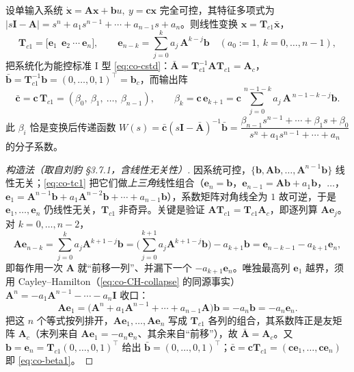 \begin{theorem}\label{thm:co-canon-transform}
设单输入系统 $\dot{\mathbf{x}}=\mathbf{A}\mathbf{x}+\mathbf{b}u,\ y=\mathbf{c}\mathbf{x}$ 完全可控，其特征多项式为 $|s\mathbf{I}-\mathbf{A}|=s^n+a_1 s^{n-1}+\cdots+a_{n-1}s+a_n$。则线性变换 $\mathbf{x}=\mathbf{T}_{c1}\bar{\mathbf{x}}$，
\begin{equation}
  \mathbf{T}_{c1}=\big[\mathbf{e}_1\ \ \mathbf{e}_2\ \cdots\ \mathbf{e}_n\big],\qquad
  \mathbf{e}_{n-k}=\sum_{j=0}^{k}a_j\,\mathbf{A}^{k-j}\mathbf{b}\quad(a_0:=1,\ k=0,\dots,n-1),
  \label{eq:co-tc1}
\end{equation}
把系统化为能控标准 I 型 \cref{eq:co-cstd}：$\bar{\mathbf{A}}=\mathbf{T}_{c1}^{-1}\mathbf{A}\mathbf{T}_{c1}=\mathbf{A}_c$，$\bar{\mathbf{b}}=\mathbf{T}_{c1}^{-1}\mathbf{b}=(0,\dots,0,1)^\top=\mathbf{b}_c$，而输出阵
\begin{equation}
  \bar{\mathbf{c}}=\mathbf{c}\,\mathbf{T}_{c1}=(\beta_0,\ \beta_1,\ \dots,\ \beta_{n-1}),\qquad
  \beta_k=\mathbf{c}\,\mathbf{e}_{k+1}=\mathbf{c}\sum_{j=0}^{\,n-1-k}a_j\,\mathbf{A}^{\,n-1-k-j}\mathbf{b}.
  \label{eq:co-beta1}
\end{equation}
此 $\beta_i$ 恰是变换后传递函数 $W(s)=\bar{\mathbf{c}}(s\mathbf{I}-\bar{\mathbf{A}})^{-1}\bar{\mathbf{b}}=\dfrac{\beta_{n-1}s^{n-1}+\cdots+\beta_1 s+\beta_0}{s^n+a_1 s^{n-1}+\cdots+a_n}$ 的分子系数\cite{liubao2006modern}。
\end{theorem}

\begin{proof}[构造法（取自刘豹 §3.7.1，含线性无关性）]
因系统可控，$\{\mathbf{b},\mathbf{A}\mathbf{b},\dots,\mathbf{A}^{n-1}\mathbf{b}\}$ 线性无关；\cref{eq:co-tc1} 把它们做\emph{上三角}线性组合（$\mathbf{e}_n=\mathbf{b}$，$\mathbf{e}_{n-1}=\mathbf{A}\mathbf{b}+a_1\mathbf{b}$，$\dots$，$\mathbf{e}_1=\mathbf{A}^{n-1}\mathbf{b}+a_1\mathbf{A}^{n-2}\mathbf{b}+\cdots+a_{n-1}\mathbf{b}$），系数矩阵对角线全为 $1$ 故可逆，于是 $\mathbf{e}_1,\dots,\mathbf{e}_n$ 仍线性无关，$\mathbf{T}_{c1}$ 非奇异。关键是验证 $\mathbf{A}\mathbf{T}_{c1}=\mathbf{T}_{c1}\mathbf{A}_c$，即逐列算 $\mathbf{A}\mathbf{e}_j$。对 $k=0,\dots,n-2$，
\[
  \mathbf{A}\mathbf{e}_{n-k}=\sum_{j=0}^{k}a_j\mathbf{A}^{k+1-j}\mathbf{b}
  =\Big(\sum_{j=0}^{k+1}a_j\mathbf{A}^{k+1-j}\mathbf{b}\Big)-a_{k+1}\mathbf{b}
  =\mathbf{e}_{n-k-1}-a_{k+1}\mathbf{e}_n,
\]
即每作用一次 $\mathbf{A}$ 就“前移一列”、并漏下一个 $-a_{k+1}\mathbf{e}_n$。唯独最高列 $\mathbf{e}_1$ 越界，须用 Cayley--Hamilton（\cref{eq:co-CH-collapse} 的同源事实）$\mathbf{A}^{n}=-a_1\mathbf{A}^{n-1}-\cdots-a_n\mathbf{I}$ 收口：
\[
  \mathbf{A}\mathbf{e}_1=\big(\mathbf{A}^{n}+a_1\mathbf{A}^{n-1}+\cdots+a_{n-1}\mathbf{A}\big)\mathbf{b}=-a_n\mathbf{b}=-a_n\mathbf{e}_n.
\]
把这 $n$ 个等式按列排开，$\mathbf{A}\mathbf{e}_1,\dots,\mathbf{A}\mathbf{e}_n$ 写成 $\mathbf{T}_{c1}$ 各列的组合，其系数阵正是友矩阵 $\mathbf{A}_c$（末列来自 $\mathbf{A}\mathbf{e}_1=-a_n\mathbf{e}_n$、其余来自“前移”），故 $\bar{\mathbf{A}}=\mathbf{A}_c$。又 $\mathbf{b}=\mathbf{e}_n=\mathbf{T}_{c1}(0,\dots,0,1)^\top$ 给出 $\bar{\mathbf{b}}=(0,\dots,0,1)^\top$；$\bar{\mathbf{c}}=\mathbf{c}\mathbf{T}_{c1}=(\mathbf{c}\mathbf{e}_1,\dots,\mathbf{c}\mathbf{e}_n)$ 即 \cref{eq:co-beta1}。
\end{proof}

